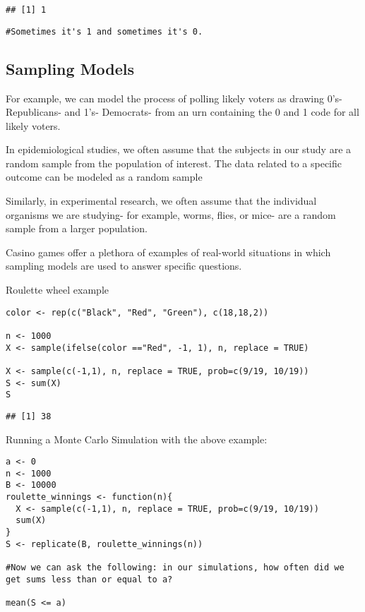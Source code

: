 \documentclass[
]{article}
\begin{document}
\begin{verbatim}
## [1] 1
\end{verbatim}

\begin{verbatim}
#Sometimes it's 1 and sometimes it's 0.
\end{verbatim}

\hypertarget{sampling-models}{%
\subsection{Sampling Models}\label{sampling-models}}

For example, we can model the process of polling likely voters as
drawing 0's- Republicans- and 1's- Democrats- from an urn containing the
0 and 1 code for all likely voters.

In epidemiological studies, we often assume that the subjects in our
study are a random sample from the population of interest. The data
related to a specific outcome can be modeled as a random sample

Similarly, in experimental research, we often assume that the individual
organisms we are studying- for example, worms, flies, or mice- are a
random sample from a larger population.

Casino games offer a plethora of examples of real-world situations in
which sampling models are used to answer specific questions.

Roulette wheel example

\begin{verbatim}
color <- rep(c("Black", "Red", "Green"), c(18,18,2))

n <- 1000
X <- sample(ifelse(color =="Red", -1, 1), n, replace = TRUE)

X <- sample(c(-1,1), n, replace = TRUE, prob=c(9/19, 10/19))
S <- sum(X)
S
\end{verbatim}

\begin{verbatim}
## [1] 38
\end{verbatim}

Running a Monte Carlo Simulation with the above example:

\begin{verbatim}
a <- 0
n <- 1000
B <- 10000
roulette_winnings <- function(n){
  X <- sample(c(-1,1), n, replace = TRUE, prob=c(9/19, 10/19))
  sum(X)
}
S <- replicate(B, roulette_winnings(n))

#Now we can ask the following: in our simulations, how often did we get sums less than or equal to a?

mean(S <= a)
\end{verbatim}
\end{document}
